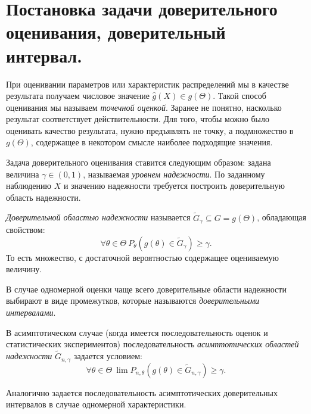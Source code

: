 \section{Постановка задачи доверительного оценивания, доверительный интервал.}

При оценивании параметров или характеристик распределений мы в качестве
результата получаем числовое значение $\hat{g}(X) \in g(\Theta)$. Такой способ 
оценивания мы называем \textit{точечной оценкой}. Заранее не понятно, 
насколько результат соответствует действительности. Для того, чтобы можно 
было оценивать качество результата, нужно предъявлять не точку, а подмножество
в $g(\Theta)$, содержащее в некотором смысле наиболее подходящие значения.

Задача доверительного оценивания ставится следующим образом: задана величина
$\gamma \in (0, 1)$, называемая \textit{уровнем надежности}. По заданному
наблюдению $X$ и значению надежности требуется построить доверительную область
надежности.

\begin{definition}
	\textit{Доверительной областью надежности} называется $\widetilde{G}_\gamma
	\subseteq G = g(\Theta)$, обладающая свойством:
	\[
		\forall \theta \in \Theta~ P_\theta(g(\theta) \in \widetilde{G}_\gamma) 
	\geqslant \gamma
	.\]
	То есть множество, с достаточной вероятностью содержащее оцениваемую 
	величину.
\end{definition}

\begin{definition}
	В случае одномерной оценки чаще всего доверительные области надежности
	выбирают в виде промежутков, которые называются \textit{доверительными
	интервалами}.
\end{definition}

\begin{definition}
	В асимптотическом случае (когда имеется последовательность оценок и
	статистических экспериментов) последовательность \textit{асимптотических
	областей надежности} $\widetilde{G}_{n, \gamma}$ задается условием:
	\[
		\forall \theta \in \Theta~ \lim{P_{n, \theta}(g(\theta) \in 
	\widetilde{G}_{n, \gamma})} \geqslant \gamma
	.\]
\end{definition}

\begin{definition}
	Аналогично задается последовательность асимптотических доверительных
	интервалов в случае одномерной характеристики.
\end{definition}


